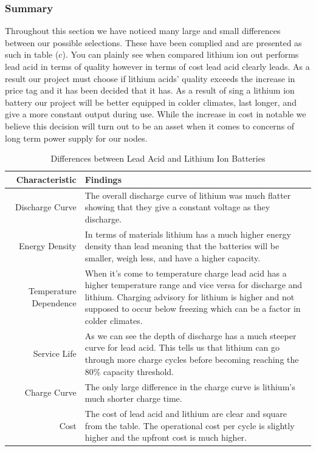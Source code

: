 \subsubsection{Summary}
Throughout this section we have noticed many large and small differences between our possible selections. These have been complied and are presented as such in table (c). You can plainly see when compared lithium ion out performs lead acid in terms of quality however in terms of cost lead acid clearly leads. As a result our project must choose if lithium acids' quality exceeds the increase in price tag and it has been decided that it has. As a result of sing a lithium ion battery our project will be better equipped in colder climates, last longer, and give a more constant output during use. While the increase in cost in notable we believe this decision will turn out to be an asset when it comes to concerns of long term power supply for our nodes.
\begin{table}
\centering\footnotesize
\caption{Differences between Lead Acid and Lithium Ion Batteries}
\begin{tabularx}{\linewidth}{|r|X|}
\hline
Characteristic & Findings \\\hline

Discharge Curve & The overall discharge curve of lithium was much flatter showing that they give a constant voltage as they discharge. 
  \\\hline
Energy Density & In terms of materials lithium has a much higher energy density than lead meaning that the batteries will be smaller, weigh less, and have a higher capacity. 
  \\\hline
Temperature Dependence & When it's come to temperature charge lead acid has a higher temperature range and vice versa for discharge and lithium. Charging advisory for lithium is higher and not supposed to occur below freezing which can be a factor in colder climates. 
  \\\hline
Service Life&As we can see the depth of discharge has a much steeper curve for lead acid. This tells us that lithium can go through more charge cycles before becoming reaching the 80\% capacity threshold. 
  \\\hline
Charge Curve&The only large difference in the charge curve is lithium's much shorter charge time. \\\hline
Cost&The cost of lead acid and lithium are clear and square from the table. The operational cost per cycle is slightly higher and the upfront cost is much higher.
  \\\hline
\end{tabularx}
\label{tab:battery-comparison}
\end{table}

